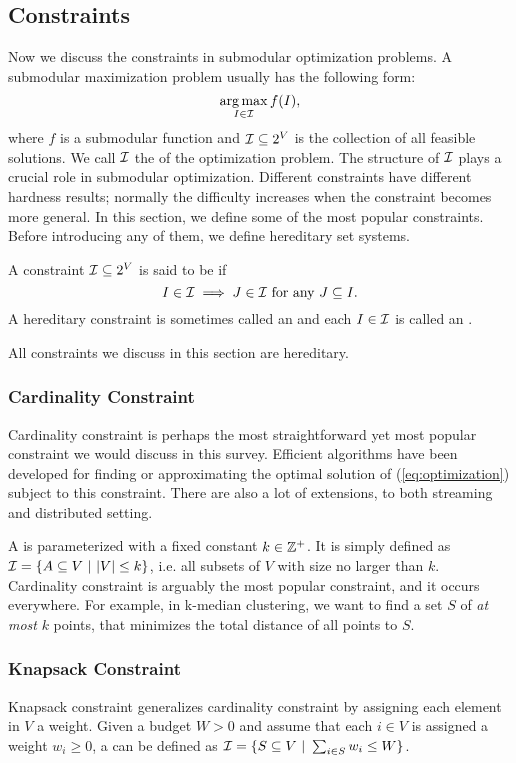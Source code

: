 \subsection{Constraints}
Now we discuss the constraints in submodular optimization problems. A submodular maximization problem usually has the following form:
\begin{equation}
  \label{eq:optimization}
  \operatorname*{arg\,max}_{I\in\mathcal{I}} f(I),
\end{equation}
where $f$ is a submodular function and $\mathcal{I} \subseteq 2^V$ is the collection of all feasible solutions. We call $\mathcal{I}$ the  of the optimization problem. The structure of $\mathcal{I}$ plays a crucial role in submodular optimization. Different constraints have different hardness results; normally the difficulty increases when the constraint becomes more general. In this section, we define some of the most popular constraints. Before introducing any of them, we define hereditary set systems.
\begin{definition}[Hereditary]
  \label{def:hereditary}
  A constraint $\mathcal{I} \subseteq 2^V$ is said to be  if 
$$I\in\mathcal{I} \implies J\in\mathcal{I} ~\text{for any}~J\subseteq I.$$
A hereditary constraint is sometimes called an  and each $I\in\mathcal{I}$ is called an . 
\end{definition}
All constraints we discuss in this section are hereditary.


\subsubsection{Cardinality Constraint}
Cardinality constraint is perhaps the most straightforward yet most popular constraint we would discuss in this survey. Efficient algorithms have been developed for finding or approximating the optimal solution of (\ref{eq:optimization}) subject to this constraint. There are also a lot of extensions, to both streaming and distributed setting. 

A  is parameterized with a fixed constant $k \in \mathbb{Z}^+$. It is simply defined as $\mathcal{I} = \{A \subseteq V ~|~ |V| \leq k\}$, i.e. all subsets of $V$ with size no larger than $k$. Cardinality constraint is arguably the most popular constraint, and it occurs everywhere. For example, in k-median clustering, we want to find a set $S$ of \emph{at most} $k$ points, that minimizes the total distance of all points to $S$.  

\subsubsection{Knapsack Constraint}
Knapsack constraint generalizes cardinality constraint by assigning each element in $V$ a weight. Given a budget $W > 0$ and assume that each $i \in V$ is assigned a weight $w_i \geq 0$, a  can be defined as $\mathcal{I} = \{S \subseteq V ~|~ \sum_{i\in S} w_i \leq W \}$.


